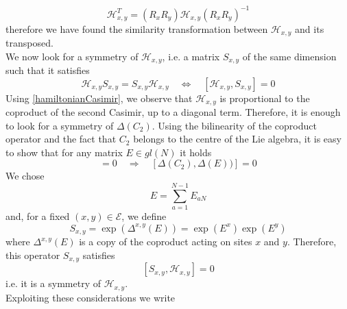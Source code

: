\documentclass[10pt]{article}
\numberwithin{equation}{section}
\numberwithin{equation}{subsection}
\begin{document}
\begin{equation}\label{transpositionPropertyH}
    \mathcal{H}_{x,y}^{T}=\left(R_{x}R_{y}\right)\mathcal{H}_{x,y}\left(R_{x}R_{y}\right)^{-1}
\end{equation}
therefore we have found the similarity transformation between $\mathcal{H}_{x,y}$ and its transposed. \\
We now look for a symmetry of $\mathcal{H}_{x,y}$, i.e. a matrix $S_{x,y}$ of the same dimension such that it satisfies 
\begin{equation}
	\mathcal{H}_{x,y}S_{x,y}=S_{x,y}\mathcal{H}_{x,y}\quad \Leftrightarrow \quad [\mathcal{H}_{x,y},S_{x,y}]=0
\end{equation}
Using \eqref{hamiltonianCasimir}, we observe that $\mathcal{H}_{x,y}$ is proportional to the coproduct of the second Casimir, up to a diagonal term. Therefore, it is enough to look for a symmetry of $\Delta (C_{2})$. Using the bilinearity of the coproduct operator and the fact that $C_{2}$ belongs to the centre of the Lie algebra, it is easy to show that for any matrix $E\in gl(N)$ it holds
\begin{equation}
	[C_{2},E]=0\quad \Rightarrow\quad \left[\Delta (C_{2}),\Delta(E)) \right]=0
\end{equation}
We chose 
\begin{equation}
	E=\sum_{a=1}^{N-1}E_{aN}
\end{equation}
and, for a fixed $(x,y)\in \mathcal{E}$, we define
\begin{equation}
	S_{x,y}=\exp{(\Delta^{x,y}(E))}=\exp{(E^{x})}\exp{(E^{y})}
\end{equation}
where $\Delta^{x,y}(E)$ is a copy of the coproduct acting on sites $x$ and $y$. Therefore, this operator $S_{x,y}$ satisfies
\begin{equation}\label{symmetryH}
	\left[S_{x,y},\mathcal{H}_{x,y}\right]=0
\end{equation}
i.e. it is a symmetry of $\mathcal{H}_{x,y}$. \\ Exploiting these considerations we write
\end{document}
